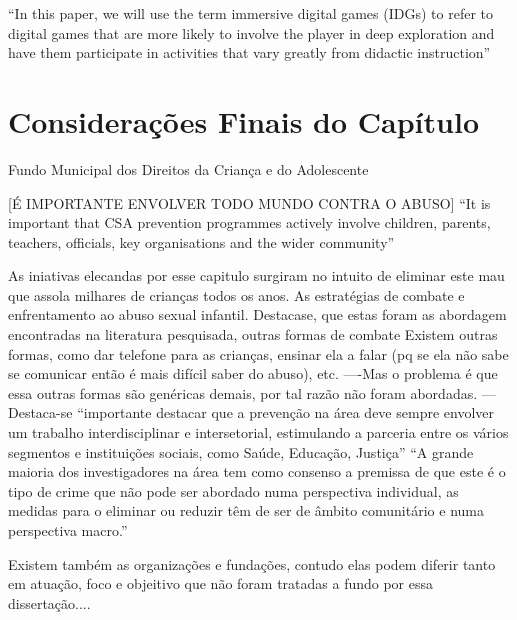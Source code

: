 ``In this paper, we will use the term immersive digital games (IDGs) to refer to digital games that are more likely to involve the player in deep exploration and have them participate in activities that vary greatly from didactic instruction'' \cite{dip2016advancing}

\section{Considerações Finais do Capítulo}\label{sec:finais}


Fundo Municipal dos Direitos da Criança e do Adolescente%

[É IMPORTANTE ENVOLVER TODO MUNDO CONTRA O ABUSO]
``It is important that CSA prevention programmes actively involve children, parents, teachers, officials, key organisations and the wider community''  \cite{dip2016advancing}

As iniativas elecandas por esse capitulo surgiram no intuito de eliminar este mau que assola milhares de crianças todos os anos. As estratégias de combate e enfrentamento ao abuso sexual infantil. Destacase, que estas foram as abordagem encontradas na literatura pesquisada, outras formas de combate Existem outras formas, como dar telefone para as crianças, ensinar ela a falar (pq se ela não sabe se comunicar então é mais difícil saber do abuso), etc. ----Mas o problema é que essa outras formas são genéricas demais, por tal razão não foram abordadas.
---
Destaca-se ``importante  destacar  que  a  prevenção  na  área  deve  sempre  envolver  um trabalho interdisciplinar e intersetorial, estimulando a parceria entre os vários segmentos e instituições   sociais,   como   Saúde,   Educação,   Justiça'' \cite{pinto2017avaliaccao}
``A grande maioria dos investigadores na área tem como consenso a premissa de que este é o tipo de crime que não pode ser abordado numa perspectiva individual, as medidas para o eliminar ou reduzir têm de ser de âmbito comunitário e numa perspectiva macro.''\cite{maria2010papel}

Existem também as organizações e fundações, contudo elas podem diferir tanto em atuação, foco e objeitivo que não foram tratadas a fundo por essa dissertação....





